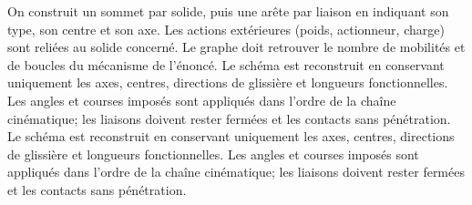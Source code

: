 \begin{corrigebox}
On construit un sommet par solide, puis une arête par liaison en
        indiquant son type, son centre et son axe. Les actions extérieures (poids,
        actionneur, charge) sont reliées au solide concerné. Le graphe doit retrouver le
        nombre de mobilités et de boucles du mécanisme de l'énoncé.
Le schéma est reconstruit en conservant uniquement les axes, centres,
        directions de glissière et longueurs fonctionnelles. Les angles et courses imposés
        sont appliqués dans l'ordre de la chaîne cinématique; les liaisons doivent rester
        fermées et les contacts sans pénétration.
Le schéma est reconstruit en conservant uniquement les axes, centres,
        directions de glissière et longueurs fonctionnelles. Les angles et courses imposés
        sont appliqués dans l'ordre de la chaîne cinématique; les liaisons doivent rester
        fermées et les contacts sans pénétration.
\end{corrigebox}
